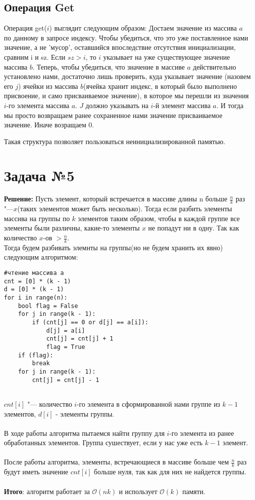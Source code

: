 \documentclass{article}
\begin{document}
\subsection*{Операция Get}
Операция get($i$) выглядит следующим образом: 
Достаем значение из массива $a$ по данному в запросе индексу. Чтобы убедиться, что это уже поставленное нами значение, а не 'мусор', оставшийся впоследствие отсутствия инициализации, сравним i и sz. Если $sz > i$, то $i$ указывает на уже существующее значение массива $b$. Теперь, чтобы убедиться, что значение в массиве $a$ действительно установлено нами, достаточно лишь проверить, куда указывает значение  (назовем его $j$) ячейки из массива $b$(ячейка хранит индекс, в который было выполнено присвоение, и само присваиваемое значение), в которое мы перешли из значения $i$-го элемента массива $a$. $J$ должно указывать на $i$-й элемент массива $a$. И тогда мы просто возвращаем ранее сохраненное нами значение присваиваемое значение. Иначе возращаем $0$.

Такая структура позволяет пользоваться неинициализированной памятью.
\section*{Задача №5}
\textbf{Решение:}
Пусть элемент, который встречается в массиве длины n больше $\frac{n}{k}$ раз "---$x$(таких элементов может быть несколько). Тогда если разбить элементы массива на группы по $k$ элементов таким образом, чтобы в каждой группе все элементы были различны, какие-то элементы $x$ не попадут ни в одну. Так как количество $x$-ов $> \frac{n}{k}$. 
\\

Тогда будем разбивать элемнты на группы(но не будем хранить их явно) следующим алгоритмом: 
\begin{verbatim}
#чтение массива a
cnt = [0] * (k - 1)
d = [0] * (k - 1)
for i in range(n):
    bool flag = False
    for j in range(k - 1):
        if (cnt[j] == 0 or d[j] == a[i]):
            d[j] = a[i]
            cnt[j] = cnt[j] + 1
            flag = True
    if (flag):
   	    break
    for j in range(k - 1):
        cnt[j] = cnt[j] - 1
        
\end{verbatim}
$cnt[i]$ "--- количество $i$-го элемента в сформированной нами группе из $k - 1$ элементов, $d[i]$ -  элементы группы.
\\\\
В ходе работы алгоритма пытаемся найти группу для $i$-го элемента из ранее обработанных элементов. Группа сушествует, если у нас уже есть $k - 1$ элемент.
\\\\
После работы алгоритма, элементы, встречающиеся в массиве больше чем $\frac{n}{k}$ раз будут иметь значение $cnt[i]$ больше нуля, так как для них не найдется группы.
\\\\
\textbf{Итого}: алгоритм работает за $\mathcal{O}(nk)$ и использует $\mathcal{O}(k)$ памяти.
\end{document}
